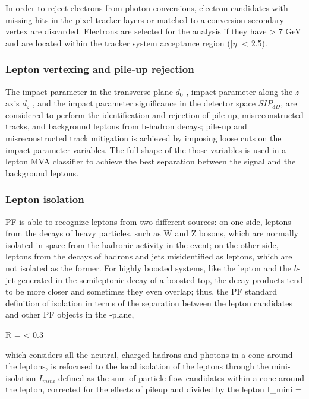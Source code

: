 In order to reject electrons from photon conversions, electron candidates with missing hits in the pixel tracker layers or matched to a conversion secondary vertex are discarded. Electrons are selected for the analysis if they have \pt > 7 GeV and are located within the tracker system acceptance region ($|\eta|$ < 2.5). %

\subsubsection*{Lepton vertexing and pile-up rejection}

The impact parameter in the transverse plane $d_0$ , impact parameter along the $z$-axis $d_z$ , and the impact parameter significance in the detector space $SIP_{3D}$, are considered to perform the identification and rejection of pile-up, misreconstructed tracks, and background leptons from b-hadron decays; pile-up and misreconstructed track mitigation is achieved by imposing loose cuts on the impact parameter variables. The full shape of the those variables is used in a lepton MVA classifier to achieve the best separation between the signal and the background leptons.

\subsubsection*{Lepton isolation}

PF is able to recognize leptons from two different sources: on one side, leptons from the decays of heavy particles, such as W and Z bosons, which are normally isolated in space from the hadronic activity in the event; on the other side, leptons from the decays of hadrons and jets misidentified as leptons, which are not isolated as the former. For highly boosted systems, like the lepton and the $b$-jet generated in the semileptonic decay of a boosted top, the decay products tend to be more closer and sometimes they even overlap; thus, the PF standard definition of isolation in terms of the separation between the lepton candidates and other PF objects in the \etac-\phic plane,

\beqn
\Delta R = < 0.3
\eeqn

\noindent which considers all the neutral, charged hadrons and photons in a cone around the leptons, is refocused to the local isolation of the leptons through the mini-isolation $I_{mini}$ \cite{i_mini} defined as the sum of particle flow candidates \pt within a cone around the lepton, corrected for the effects of pileup and divided by the lepton \pt
\beqn
I_{mini} =
\eeqn

